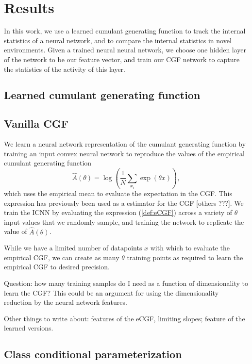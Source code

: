 \documentclass[10pt]{article}      %
\begin{document}
\section{Results}

In this work, we use a learned cumulant generating function to track the internal statistics of a neural network, and to compare the internal statistics in novel environments.
Given a trained neural neural network, we choose one hidden layer of the network to be our feature vector, and train our CGF network to capture the statistics of the activity of this layer. 




\newpage
\subsection{Learned cumulant generating function}
\subsection{Vanilla CGF}
We learn a neural network representation of the cumulant generating function by training an input convex neural network \cite{amos_input_2017,hoedt_principled_2023} to reproduce the values of the empirical cumulant generating function
\begin{equation}
  \hat A(\theta) = \log \left( \frac{1}{N}\sum_{x_i} \exp(\theta x) \right), \label{def:eCGF}
\end{equation}
which uses the empirical mean to evaluate the expectation in the CGF. 
This expression has previously been used as a estimator for the CGF \cite{duffield_entropy_1995} [others ???]. 
We train the ICNN by evaluating the expression (\ref{def:eCGF}) across a variety of $\theta$ input values that we randomly sample, and training the network to replicate the value of $\hat A(\theta)$.

While we have a limited number of datapoints $x$ with which to evaluate the empirical CGF, we can create as many $\theta$ training points as required to learn the empirical CGF to desired precision.

Question: how many training samples do I need as a function of dimensionality to learn the CGF? This could be an argument for using the dimensionality reduction by the neural network features.

Other things to write about: features of the eCGF, limiting slopes; feature of the learned versions.


\subsection{Class conditional parameterization}
\end{document}
